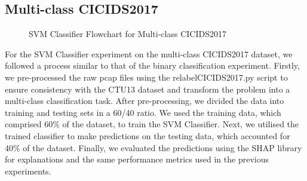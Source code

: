 \subsection{Multi-class CICIDS2017}\label{subsec:SVMClassifierMultiCICIDS2017}
\begin{figure}[H]
\centering
{}
\caption{SVM Classifier Flowchart for Multi-class CICIDS2017}\label{fig:SVMFlowMultiCICIDS2017}
\end{figure}

For the SVM Classifier experiment on the multi-class CICIDS2017 dataset, we followed a process similar to that of the binary classification experiment. Firstly, we pre-processed the raw pcap files using the relabelCICIDS2017.py script to ensure consistency with the CTU13 dataset and transform the problem into a multi-class classification task. After pre-processing, we divided the data into training and testing sets in a 60/40 ratio. We used the training data, which comprised 60\% of the dataset, to train the SVM Classifier. Next, we utilised the trained classifier to make predictions on the testing data, which accounted for 40\% of the dataset. Finally, we evaluated the predictions using the SHAP library for explanations and the same performance metrics used in the previous experiments.
